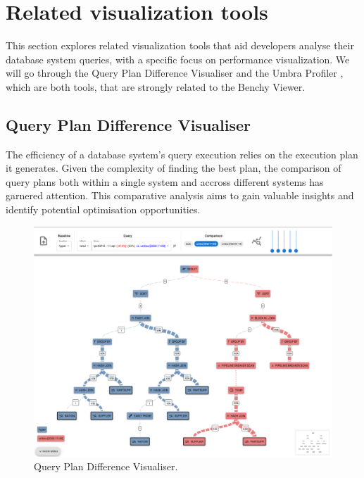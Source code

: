 \section{Related visualization tools}

This section explores related visualization tools that aid developers analyse their database system queries, with a specific focus on performance visualization. We will go through the Query Plan Difference Visualiser \parencite*{semantic-diff} and the Umbra Profiler \parencite*{profiling-dataflow}, which are both tools, that are strongly related to the Benchy Viewer. 


\subsection{Query Plan Difference Visualiser}
\label{subsec:semantic-diff}

The efficiency of a database system's query execution relies on the execution plan it generates.  Given the complexity of finding the best plan, the comparison of query plans both within a single system and accross different systems has garnered attention. This comparative analysis aims to gain valuable insights and identify potential optimisation opportunities.

\begin{figure}[h]
  \centering
  \includegraphics[width=0.8\linewidth]{figures/semantic-diff.png}
  \caption{Query Plan Difference Visualiser.}
  \label{fig:semantic-diff}
\end{figure}

